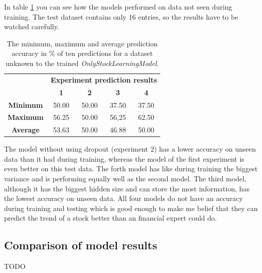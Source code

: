 In table \ref{tbl:oslmpredictresults} you can see how the models performed on data not seen during training. The test dataset contains only 16 entries, so the results have to be watched carefully.
\begin{table}[!ht]
	\begin{center}
		\begin{tabular}{c|c|c|c|c|}
			\multirow{2}{1cm}{} & \multicolumn{4}{c|}{\textbf{Experiment prediction results}} \\
			& \textbf{1} & \textbf{2} & \textbf{3} & \textbf{4}\\
			\hline
			\textbf{Minimum} & 50.00 & 50.00 & 37.50 & 37.50 \\
			\hline
			\textbf{Maximum} & 56.25 & 50.00 & 56,25 & 62.50 \\
			\hline
			\textbf{Average} & 53.63 & 50.00 & 46.88 & 50.00 \\
		\end{tabular}
	\end{center}
	\caption{The minimum, maximum and average prediction accuracy in \% of ten predictions for a dataset unknown to the trained \textit{OnlyStockLearningModel}. }
	\label{tbl:oslmpredictresults}
\end{table}
The model without using dropout (experiment 2) has a lower accuracy on unseen data than it had during training, whereas the model of the first experiment is even better on this test data. The forth model has like during training the biggest variance and is performing equally well as the second model. The third model, although it has the biggest hidden size and can store the most information, has the lowest accuracy on unseen data. All four models do not have an accuracy during training and testing which is good enough to make me belief that they can predict the trend of a stock better than an financial expert could do.


\subsection{Comparison of model results}
\label{subsec:compmodelresults}	
TODO


